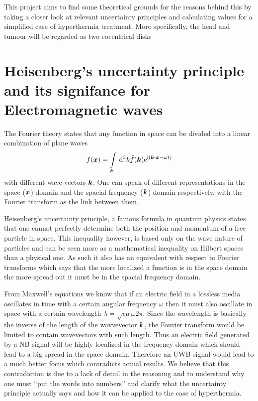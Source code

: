 \documentclass[11pt,a4paper, 
english, swedish %
]{article}
\begin{document}
This project aims to find some theoretical grounds for the reasons behind this by taking a closer look at relevant uncertainty principles and calculating values for a simplified case of hyperthermia treatment. More specifically, the head and tumour will be regarded as two cocentrical disks


\section{Heisenberg's uncertainty principle and its signifance for Electromagnetic waves}
The Fourier theory states that any function in space can be divided into a linear combination of plane waves 
\begin{equation*}
 f(\vb*x) = \int_{\vb*k}\id^3k \tilde{f}(\vb*k) \ee^{\ii( \vb*k\vdot\vb*x - \omega t)}
\end{equation*}
with different wave-vectors $\vb*k$. %
One can speak of different representations in the space ($\vb*x$) domain and the spacial frequency ($\vb*k$) domain respectively, with the Fourier transform as the link between them.

Heisenberg's uncertainty principle, a famous formula in quantum physics states that one cannot perfectly determine both the position and momentum of a free particle in space. This inequality however, is based only on the wave nature of particles and can be seen more as a mathematical inequality on Hilbert spaces than a physical one. As such it also has an equivalent with respect to Fourier transforms which says that the more localized a function is in the space domain the more spread out it must be in the spacial frequency domain.

From Maxwell's equations we know that if an electric field in a lossless media oscillates in time with a certain angular frequency $\omega$ then it  must also oscillate in space with a certain wavelength $\lambda=\sqrt{\epsilon \mu} \omega 2\pi$. Since the wavelength is basically the inverse of the length of the wavvevector $\vb*k$, the Fourier transform would be limited to contain wavevectors with such length. Thus an electric field generated by a NB signal will be highly localized in the frequency domain which should lead to a big spread in the space domain. Therefore an UWB signal would lead to a much better focus which contradicts actual results. We believe that this contradiction is due to a lack of detail in the reasoning and to understand why one must ``put the words into numbers'' and clarify what the uncertainty principle actually says and how it can be applied to the case of hyperthermia.
\end{document}
